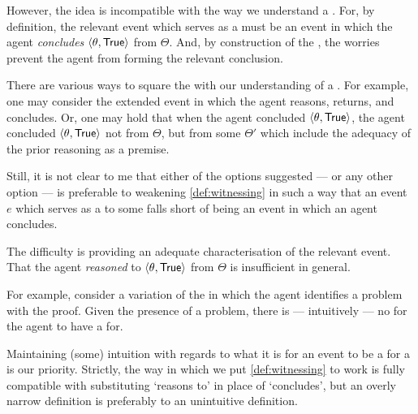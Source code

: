 \begin{note}
{  However, the idea is incompatible with the way we understand a .
  For, by definition, the relevant event which serves as a  must be an event in which the agent \emph{concludes} \(\langle \theta, \text{\textsf{True}} \rangle\) from \(\Theta\).
  And, by construction of the , the \agents{} worries prevent the agent from forming the relevant conclusion.

  There are various ways to square the  with our understanding of a .
  For example, one may consider the extended event in which the agent reasons, returns, and concludes.
  Or, one may hold that when the agent concluded \(\langle \theta, \text{\textsf{True}} \rangle\), the agent concluded \(\langle \theta, \text{\textsf{True}} \rangle\) not from \(\Theta\), but from some \pool{} \(\Theta'\) which include the adequacy of the \agents{} prior reasoning as a premise.

  Still, it is not clear to me that either of the options suggested --- or any other option --- is preferable to weakening \autoref{def:witnessing} in such a way that an event \(e\) which serves as a \wit{} to some \ros{} falls short of being an event in which an agent concludes.

  The difficulty is providing an adequate characterisation of the relevant event.
  That the agent \emph{reasoned} to \(\langle \theta, \text{\textsf{True}} \rangle\) from \(\Theta\) is insufficient in general.

  For example, consider a variation of the \scen{} in which the agent identifies a problem with the proof.
  Given the presence of a problem, there is --- intuitively --- no \ros{} for the agent to have a  for.

  Maintaining (some) intuition with regards to what it is for an event to be a  for a  is our priority.
  Strictly, the way in which we put \autoref{def:witnessing} to work is fully compatible with substituting `reasons to' in place of `concludes', but an overly narrow definition is preferably to an unintuitive definition.
  }
\end{note}

\subsection{\supportII{}}
\label{cha:var:ros:II}

